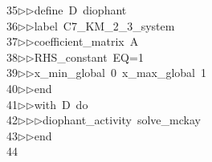 \begin{tabbing}
35\>$\triangleright$\>$\triangleright$\>define\ D\ diophant\ \\[0pt]
36\>$\triangleright$\>$\triangleright$\>label\ C7\_KM\_2\_3\_system\ \\[0pt]
37\>$\triangleright$\>$\triangleright$\>coefficient\_matrix\ A\ \\[0pt]
38\>$\triangleright$\>$\triangleright$\>RHS\_constant\ EQ=1\ \\[0pt]
39\>$\triangleright$\>$\triangleright$\>x\_min\_global\ 0\ x\_max\_global\ 1\ \\[0pt]
40\>$\triangleright$\>$\triangleright$\>end\ \\[0pt]
41\>$\triangleright$\>$\triangleright$\>with\ D\ do\ \\[0pt]
42\>$\triangleright$\>$\triangleright$\>$\triangleright$\>diophant\_activity\ solve\_mckay\ \\[0pt]
43\>$\triangleright$\>$\triangleright$\>end\\[0pt]
44\>\end{tabbing}
